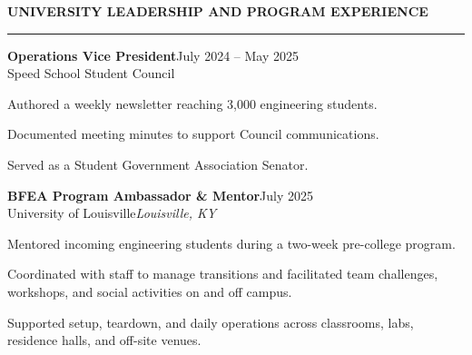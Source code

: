\documentclass[11pt,letterpaper]{article}
\renewenvironment{itemize}{%
  \begin{list}{\textbullet}{%
    \setlength{\leftmargin}{1.4em}%
    \setlength{\topsep}{5pt}%
    \setlength{\itemsep}{4pt}%
    \setlength{\parsep}{0pt}%
    \setlength{\partopsep}{0pt}}%
}{\end{list}}
\newcommand{\resumesection}[1]{%
  \par\addvspace{12pt}%
  {\large\bfseries #1}\par\vspace{3pt}\hrule\vspace{6pt}}
\newcommand{\role}[4]{%
  \textbf{#1}\hfill #2\\%
  #3\hfill\textit{#4}\par}
\begin{document}
\resumesection{UNIVERSITY LEADERSHIP AND PROGRAM EXPERIENCE}
\role{Operations Vice President}{July 2024 -- May 2025}
  {Speed School Student Council}{}
\begin{itemize}
  \item Authored a weekly newsletter reaching 3,000 engineering students.
  \item Documented meeting minutes to support Council communications.
  \item Served as a Student Government Association Senator.
\end{itemize}
\vspace{4pt}
\role{BFEA Program Ambassador \& Mentor}{July 2025}
  {University of Louisville}{Louisville, KY}
\begin{itemize}
  \item Mentored incoming engineering students during a two-week pre-college program.
  \item Coordinated with staff to manage transitions and facilitated team challenges, workshops, and social activities on and off campus.
  \item Supported setup, teardown, and daily operations across classrooms, labs, residence halls, and off-site venues.
\end{itemize}
\end{document}
